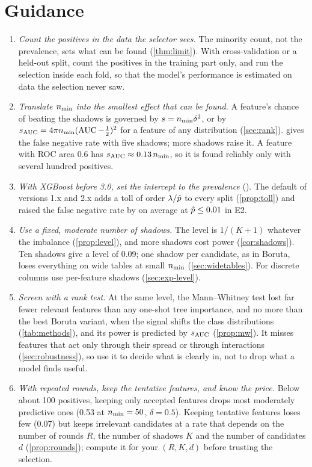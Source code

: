 \section{Guidance}\label{sec:guidance}


\begin{enumerate}[label=\textbf{Rule \arabic*.},leftmargin=*,align=left]
  \item \emph{Count the positives in the data the selector sees.} The minority count, not the prevalence, sets what can be found (\cref{thm:limit}). With cross-validation or a held-out split, count the positives in the training part only, and run the selection inside each fold, so that the model's performance is estimated on data the selection never saw.
  \item \emph{Translate $n_{\min}$ into the smallest effect that can be found.} A feature's chance of beating the shadows is governed by $s = n_{\min}\delta^2$, or by $s_{\mathrm{AUC}} = 4\pi n_{\min}(\operatorname{AUC} - \frac12)^2$ for a feature of any distribution (\cref{sec:rank}).  gives the false negative rate with five shadows; more shadows raise it. A feature with ROC area 0.6 has $s_{\mathrm{AUC}} \approx 0.13\,n_{\min}$, so it is found reliably only with several hundred positives.
  \item \emph{With XGBoost before 3.0, set the intercept to the prevalence} (). The default of versions 1.x and 2.x adds a toll of order $\lambda/\hat p$ to every split (\cref{prop:toll}) and raised the false negative rate by \numGapMeanSmall{} on average at $\hat p \le 0.01$ in E2.
  \item \emph{Use a fixed, moderate number of shadows.} The level is $1/(K+1)$ whatever the imbalance (\cref{prop:level}), and more shadows cost power (\cref{cor:shadows}). Ten shadows give a level of 0.09; one shadow per candidate, as in Boruta, loses everything on wide tables at small $n_{\min}$ (\cref{sec:widetables}). For discrete columns use per-feature shadows (\cref{sec:exp-level}).
  \item \emph{Screen with a rank test.} At the same level, the Mann--Whitney test lost far fewer relevant features than any one-shot tree importance, and no more than the best Boruta variant, when the signal shifts the class distributions (\cref{tab:methods}), and its power is predicted by $s_{\mathrm{AUC}}$ (\cref{prop:mw}). It misses features that act only through their spread or through interactions (\cref{sec:robustness}), so use it to decide what is clearly in, not to drop what a model finds useful.
  \item \emph{With repeated rounds, keep the tentative features, and know the price.} Below about 100 positives, keeping only accepted features drops most moderately predictive ones (0.53 at $n_{\min} = 50$, $\delta = 0.5$). Keeping tentative features loses few (0.07) but keeps irrelevant candidates at a rate that depends on the number of rounds $R$, the number of shadows $K$ and the number of candidates $d$ (\cref{prop:rounds}); compute it for your $(R, K, d)$ before trusting the selection.

\end{enumerate}

